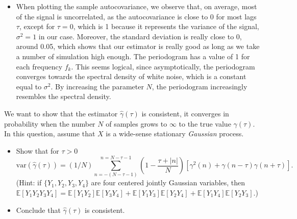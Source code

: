 \documentclass[11pt]{article}
\begin{document}
\begin{exercise}
\end{exercise}

\begin{solution}
    \begin{itemize}
        \item When plotting the sample autocovariance, we observe that, on average, most of the signal is uncorrelated, as the autocovariance is close to 0 for most lags $\tau$, except for $\tau=0$, which is 1 because it represents the variance of the signal, $\sigma^2=1$ in our case. Moreover, the standard deviation is really close to 0, around 0.05, which shows that our estimator is really good as long as we take a number of simulation high enough.
        The periodogram has a value of 1 for each frequency $f_k$. This seems logical, since asymptotically, the periodogram converges towards the spectral density of white noise, which is a constant equal to $\sigma^2$. By increasing the parameter $N$, the periodogram increasingly resembles the spectral density.
    \end{itemize}
\end{solution}

\begin{exercise}
    We want to show that the estimator $\hat{\gamma}(\tau)$ is consistent, \ie it converges in probability when the number $N$ of samples grows to $\infty$ to the true value ${\gamma}(\tau)$.
    In this question, assume that $X$ is a wide-sense stationary \textit{Gaussian} process.
    \begin{itemize}
        \item Show that for $\tau>0$ 
    \begin{equation}
       \text{var}(\hat{\gamma}(\tau)) = (1/N) \sum_{n=-(N-\tau-1)}^{n=N-\tau-1} \left(1 - \frac{\tau + |n|}{N}\right) \left[\gamma^2(n) + \gamma(n-\tau)\gamma(n+\tau)\right].
    \end{equation}
    (Hint: if $\{Y_1, Y_2, Y_3, Y_4\}$ are four centered jointly Gaussian variables, then $\mathbb{E}[Y_1 Y_2 Y_3 Y_4] = \mathbb{E}[Y_1 Y_2]\mathbb{E}[Y_3 Y_4] + \mathbb{E}[Y_1 Y_3]\mathbb{E}[Y_2 Y_4] + \mathbb{E}[Y_1 Y_4]\mathbb{E}[Y_2 Y_3]$.) 
    \item Conclude that $\hat{\gamma}(\tau)$ is consistent.
    \end{itemize}
\end{exercise}
\end{document}
